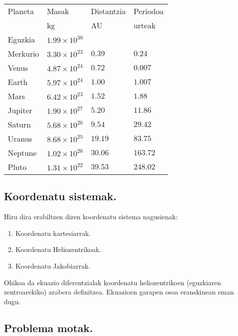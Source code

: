 \begin{table} [h!]
\caption{}
\label{tab:1}       %
\begin{tabular}{l l l l} 
\hline
 Planeta   &  Masak                 & Distantzia   & Periodoa    \\   
           &  kg                    & AU           &   urteak      \\ \hline
 Eguzkia   &  $1.99 \times 10^{30}$ &              &              \\         
 Merkurio  &  $3.30 \times 10^{23}$ & $0.39$       &  $0.24$     \\
 Venus     &  $4.87 \times 10^{24}$ & $0.72$       &  $0.007$    \\
 Earth     &  $5.97 \times 10^{24}$ & $1.00$       &  $1.007$    \\
 Mars      &  $6.42 \times 10^{23}$ & $1.52$       &  $1.88$     \\ \hline
 Jupiter   &  $1.90 \times 10^{27}$ & $5.20$       &  $11.86$    \\
 Saturn    &  $5.68 \times 10^{26}$ & $9.54$       &  $29.42$    \\
 Uranus    &  $8.68 \times 10^{25}$ & $19.19$      &  $83.75$    \\
 Neptune   &  $1.02 \times 10^{26}$ & $30.06$      &  $163.72$    \\
 Pluto     &  $1.31 \times 10^{22}$ & $39.53$      &  $248.02$    \\
\hline
\end{tabular}
\end{table}

\subsection*{Koordenatu sistemak.}

Hiru dira erabiltzen diren koordenatu sistema nagusienak:

\begin{enumerate}
\item Koordenatu kartesiarrak.
\item Koordenatu Heliozentrikoak.
\item Koordenatu Jakobiarrak.
\end{enumerate}

Ohikoa da ekuazio diferentzialak koordenatu heliozentrikoen (eguzkiaren zentroarekiko) arabera definitzea. 
Ekuazioen garapen osoa eranskinean eman dugu.


\subsection*{Problema motak.}

